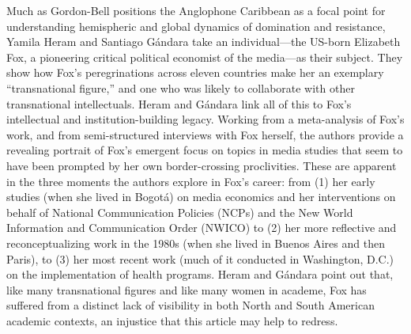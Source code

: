 \documentclass{tufte-handout}
\begin{document}
\newpage Much as Gordon-Bell positions the Anglophone Caribbean as a focal point
for understanding hemispheric and global dynamics of domination and
resistance, Yamila Heram and Santiago Gándara take an individual---the
US-born Elizabeth Fox, a pioneering critical political economist of the
media---as their subject. They show how Fox's peregrinations across
eleven countries make her an exemplary ``transnational figure,'' and one
who was likely to collaborate with other transnational intellectuals.
Heram and Gándara link all of this to Fox's intellectual and
institution-building legacy. Working from a meta-analysis of Fox's work,
and from semi-structured interviews with Fox herself, the authors
provide a revealing portrait of Fox's emergent focus on topics in media
studies that seem to have been prompted by her own border-crossing
proclivities. These are apparent in the three moments the authors
explore in Fox's career: from (1) her early studies (when she lived in
Bogotá) on media economics and her interventions on behalf of National
Communication Policies (NCPs) and the New World Information and
Communication Order (NWICO) to (2) her more reflective and
reconceptualizing work in the 1980s (when she lived in Buenos Aires and
then Paris), to (3) her most recent work (much of it conducted in
Washington, D.C.) on the implementation of health programs. Heram and
Gándara point out that, like many transnational figures and like many
women in academe, Fox has suffered from a distinct lack of visibility in
both North and South American academic contexts, an injustice that this
article may help to redress.
\end{document}
